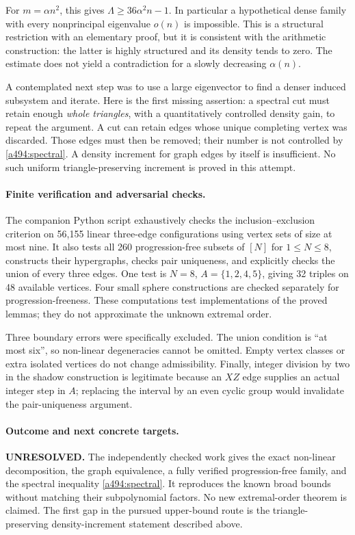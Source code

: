 \documentclass[11pt]{article}
\begin{document}
For $m=\alpha n^2$, this gives $\Lambda\geq36\alpha^2 n-1$.
In particular a hypothetical dense family with every nonprincipal
eigenvalue $o(n)$ is impossible. This is a structural restriction with an
elementary proof, but it is consistent with the arithmetic construction:
the latter is highly structured and its density tends to zero. The estimate
does not yield a contradiction for a slowly decreasing $\alpha(n)$.

A contemplated next step was to use a large eigenvector to find a denser
induced subsystem and iterate. Here is the first missing assertion: a
spectral cut must retain enough \emph{whole triangles}, with a quantitatively
controlled density gain, to repeat the argument. A cut can retain edges
whose unique completing vertex was discarded. Those edges must then be
removed; their number is not controlled by \eqref{a494:spectral}. A density
increment for graph edges by itself is insufficient. No such uniform
triangle-preserving increment is proved in this attempt.

\paragraph{Finite verification and adversarial checks.}
The companion Python script exhaustively checks the inclusion--exclusion
criterion on 56,155 linear three-edge configurations using vertex sets of
size at most nine. It also tests all 260 progression-free subsets of
$[N]$ for $1\leq N\leq8$, constructs their hypergraphs, checks pair
uniqueness, and explicitly checks the union of every three edges. One
test is $N=8$, $A=\{1,2,4,5\}$, giving 32 triples on 48 available
vertices. Four small sphere constructions are checked separately for
progression-freeness. These computations test implementations of the
proved lemmas; they do not approximate the unknown extremal order.

Three boundary errors were specifically excluded. The union condition is
``at most six'', so non-linear degeneracies cannot be omitted. Empty vertex
classes or extra isolated vertices do not change admissibility. Finally,
integer division by two in the shadow construction is legitimate because
an $XZ$ edge supplies an actual integer step in $A$; replacing the interval
by an even cyclic group would invalidate the pair-uniqueness argument.

\paragraph{Outcome and next concrete targets.}
\textbf{UNRESOLVED.} The independently checked work gives the exact
non-linear decomposition, the graph equivalence, a fully verified
progression-free family, and the spectral inequality
\eqref{a494:spectral}. It reproduces the known broad bounds without
matching their subpolynomial factors. No new extremal-order theorem is
claimed. The first gap in the pursued upper-bound route is the
triangle-preserving density-increment statement described above.
\end{document}
